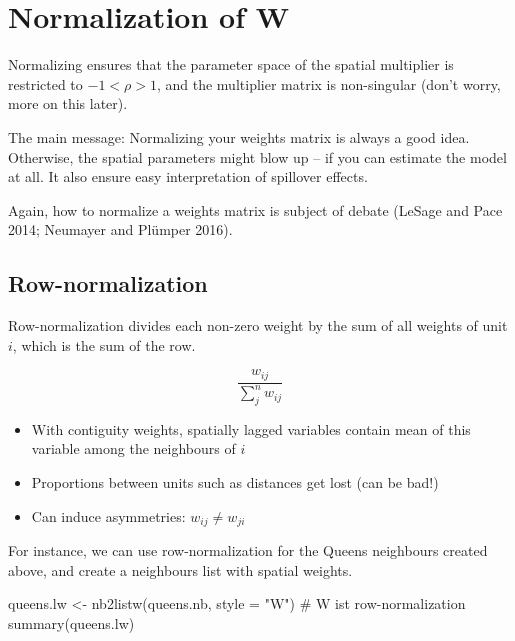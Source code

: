 \documentclass[
  letterpaper,
  DIV=11,
  numbers=noendperiod]{scrreprt}
\newenvironment{Shaded}{\begin{snugshade}}{\end{snugshade}}
\newcommand{\AttributeTok}[1]{\textcolor[rgb]{0.40,0.45,0.13}{#1}}
\newcommand{\CommentTok}[1]{\textcolor[rgb]{0.37,0.37,0.37}{#1}}
\newcommand{\FunctionTok}[1]{\textcolor[rgb]{0.28,0.35,0.67}{#1}}
\newcommand{\NormalTok}[1]{\textcolor[rgb]{0.00,0.23,0.31}{#1}}
\newcommand{\OtherTok}[1]{\textcolor[rgb]{0.00,0.23,0.31}{#1}}
\newcommand{\StringTok}[1]{\textcolor[rgb]{0.13,0.47,0.30}{#1}}
\begin{document}
\hypertarget{normalization-of-boldsymbolmathbfw}{%
\section{\texorpdfstring{Normalization of
\({\boldsymbol{\mathbf{W}}}\)}{Normalization of \{\textbackslash boldsymbol\{\textbackslash mathbf\{W\}\}\}}}\label{normalization-of-boldsymbolmathbfw}}

Normalizing ensures that the parameter space of the spatial multiplier
is restricted to \(-1 < \rho > 1\), and the multiplier matrix is
non-singular (don't worry, more on this later).

The main message: Normalizing your weights matrix is always a good idea.
Otherwise, the spatial parameters might blow up -- if you can estimate
the model at all. It also ensure easy interpretation of spillover
effects.

Again, how to normalize a weights matrix is subject of debate (LeSage
and Pace 2014; Neumayer and Plümper 2016).

\hypertarget{row-normalization}{%
\subsection{Row-normalization}\label{row-normalization}}

Row-normalization divides each non-zero weight by the sum of all weights
of unit \(i\), which is the sum of the row.

\[
\frac{w_{ij}}{\sum_j^n w_{ij}}
\]

\begin{itemize}
\item
  With contiguity weights, spatially lagged variables contain mean of
  this variable among the neighbours of \(i\)
\item
  Proportions between units such as distances get lost (can be bad!)
\item
  Can induce asymmetries: \(w_{ij} \neq w_{ji}\)
\end{itemize}

For instance, we can use row-normalization for the Queens neighbours
created above, and create a neighbours list with spatial weights.

\begin{Shaded}
\begin{Highlighting}[]
\NormalTok{queens.lw }\OtherTok{\textless{}{-}} \FunctionTok{nb2listw}\NormalTok{(queens.nb,}
                      \AttributeTok{style =} \StringTok{"W"}\NormalTok{) }\CommentTok{\# W ist row{-}normalization}
\FunctionTok{summary}\NormalTok{(queens.lw)}
\end{Highlighting}
\end{Shaded}
\end{document}
